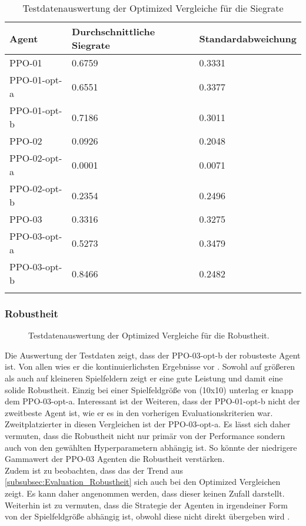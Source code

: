 \begin{longtable}[h]{|p{4.5cm}|p{4.5cm}|p{4.5cm}|}
	\hline
	Agent & Durchschnittliche Siegrate & Standardabweichung \\
	\hline
	PPO-01 & 0.6759 & 0.3331 \\ 
	\hline
	PPO-01-opt-a & 0.6551 & 0.3377 \\ 
	\hline
	PPO-01-opt-b & 0.7186 & 0.3011 \\ 
	\hline
	PPO-02 & 0.0926 & 0.2048 \\ 
	\hline
	PPO-02-opt-a & 0.0001 & 0.0071 \\ 
	\hline
	PPO-02-opt-b & 0.2354 & 0.2496 \\ 
	\hline
	PPO-03 & 0.3316 & 0.3275 \\ 
	\hline
	PPO-03-opt-a & 0.5273 & 0.3479 \\ 
	\hline
	PPO-03-opt-b & 0.8466 & 0.2482 \\ 
	\hline
	\caption{Testdatenauswertung der Optimized Vergleiche für die Siegrate}
	\label{tab:Evaluation_Testdaten_Winrate_Optimized} 
\end{longtable}

\subsubsection{Robustheit}
\begin{figure}[H]
	\centering
	
	\caption[Robustheit - Auswertung der Testdaten der Optimized Vergleiche]{Testdatenauswertung der Optimized Vergleiche für die Robustheit.}
	\label{fig:Evaluation_Robustheit_Optimized}
\end{figure}
Die Auswertung der Testdaten zeigt, dass der PPO-03-opt-b der robusteste Agent ist.
Von allen wies er die kontinuierlichsten Ergebnisse vor . Sowohl auf größeren als auch auf kleineren Spielfeldern zeigt er eine gute Leistung und damit eine solide Robustheit. 
Einzig bei einer Spielfeldgröße von (10x10) unterlag er knapp dem PPO-03-opt-a.
Interessant ist der Weiteren, dass der PPO-01-opt-b nicht der zweitbeste Agent ist, wie er es in den vorherigen Evaluationskriterien war. Zweitplatzierter in diesen Vergleichen ist der PPO-03-opt-a. Es lässt sich daher vermuten, dass die Robustheit nicht nur primär von der Performance sondern auch von den gewählten Hyperparametern abhängig ist. So könnte der niedrigere Gammawert der PPO-03 Agenten die Robustheit verstärken.\\
Zudem ist zu beobachten, dass das der Trend aus \autoref{subsubsec:Evaluation_Robustheit} sich auch bei den Optimized Vergleichen zeigt. Es kann daher angenommen werden, dass dieser keinen Zufall darstellt.
Weiterhin ist zu vermuten, dass die Strategie der Agenten in irgendeiner Form von der Spielfeldgröße abhängig ist, obwohl diese nicht direkt übergeben wird .

